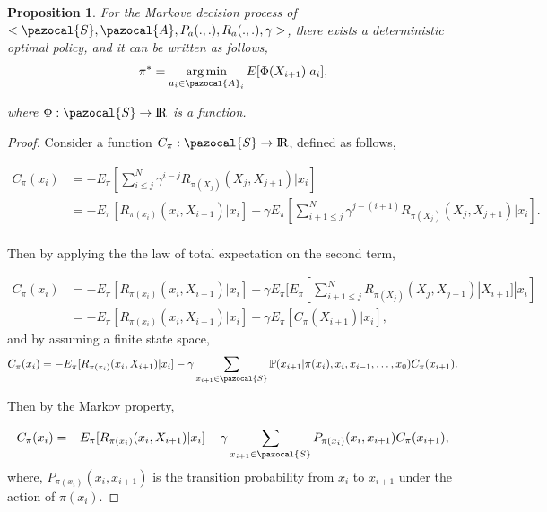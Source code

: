 \documentclass[12pt,aas_macros]{article}
\newtheorem{prop}{Proposition}
\theoremstyle{definition}
\DeclareMathOperator*{\argmin}{arg\,min}
\begin{document}
\begin{prop} \label{prop_main}
For the Markove decision process of $<\pazocal{S},\pazocal{A}, P_a(.,.), R_a(.,.), \gamma>$, there exists a deterministic optimal policy, and it can be written as follows, 
\begin{equation}\label{equ_opt_pol}
\pi^*= \argmin_{a_{i} \in \pazocal{A}_i} E[\Phi(X_{{i+1}}) | a_{i}],
\end{equation}

where $\Phi: \pazocal{S} \rightarrow \rm I\!R$ is a function.
\end{prop}

\begin{proof}
Consider a function $C_{\pi}: \pazocal{S} \rightarrow \rm I\!R$, defined as follows,

\begin{equation*}
\begin{aligned}
C_{\pi}(x_{i}) &= -E_{\pi}[ \sum_{i\leq j}^N \gamma^{i - j} R_{\pi(X_j)}(X_{j}, X_{{j+1}}) |x_{i}]\\
& = - E_{\pi}[R_{\pi(x_i)}(x_{i}, X_{{i+1}}) | x_{i}] - \gamma E_{\pi}[ \sum_{ i+1 \leq j}^N \gamma^{j-(i+1)} R_{\pi(X_j)}(X_{j}, X_{j+1}) | x_{i}].\\
\end{aligned}
\end{equation*}

Then by applying the the law of total expectation on the second term,

\begin{equation*}
\begin{aligned}
C_{\pi}(x_{{i}}) &= - E_{\pi}[R_{\pi(x_i)}(x_{i}, X_{{i+1}}) | x_{i}] - \gamma E_{\pi}[ E_{\pi}[ \sum_{ i+1 \leq j}^N R_{\pi(X_j)}(X_{j}, X_{{j+1}}) |X_{{i+1}}]| x_{i}]\\
&=  - E_{\pi}[R_{\pi(x_i)}(x_{i}, X_{{i+1}}) | x_{i}] - \gamma E_{\pi}[ C_{\pi}({X_{{i+1}}})| x_{i}],
\end{aligned}
\end{equation*}
and by assuming a finite state space,
\begin{equation*}
C_{\pi}(x_{{i}}) =  - E_{\pi}[R_{\pi(x_i)}(x_{i}, X_{{i+1}}) | x_{i}]  - \gamma \sum_{x_{i+1} \in \pazocal{S}} \mathbb P(x_{i+1}|\pi(x_i), x_{i}, x_{i-1},\dots, x_{0}) C_{\pi}({x_{{i+1}}}).\\
\end{equation*}

Then by the Markov property,

\begin{equation*}
\begin{aligned}
C_{\pi}(x_{i}) &=  - E_{\pi}[R_{\pi(x_i)}(x_{i}, X_{{i+1}}) | x_{i}] - \gamma \sum_{x_{i+1} \in \pazocal{S}} P_{\pi(x_{i})}(x_{i},x_{i+1}) C_{\pi}({x_{{i+1}}}),\\
\end{aligned}
\end{equation*}
where, $P_{\pi(x_{i})}(x_{i},x_{i+1}) $ is the transition probability from $x_i$ to $x_{i+1}$ under the action of $\pi(x_i)$. 


\end{proof}
\end{document}
